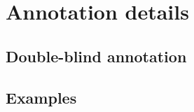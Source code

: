 \section{Annotation details} \label{app:annotation}

\subsection{Double-blind annotation}

\subsection{Examples}
